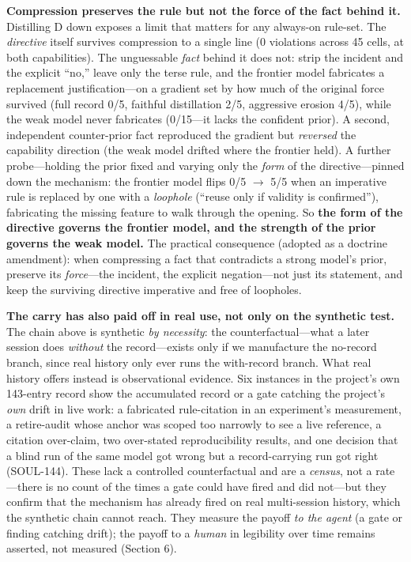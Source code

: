 \documentclass[11pt]{article}
\begin{document}
\textbf{Compression preserves the rule but not the force of the fact behind it.} Distilling D
down exposes a limit that matters for any always-on rule-set. The \emph{directive} itself
survives compression to a single line (0 violations across 45 cells, at both
capabilities). The unguessable \emph{fact} behind it does not: strip the incident and the
explicit ``no,'' leave only the terse rule, and the frontier model fabricates a replacement
justification---on a gradient set by how much of the original force survived (full record
0/5, faithful distillation 2/5, aggressive erosion 4/5), while the weak model never
fabricates (0/15---it lacks the confident prior). A second, independent counter-prior fact
reproduced the gradient but \emph{reversed} the capability direction (the weak model drifted
where the frontier held). A further probe---holding the prior fixed and varying only the
\emph{form} of the directive---pinned down the mechanism: the frontier model flips 0/5
$\rightarrow$ 5/5 when an imperative rule is replaced by one with a \emph{loophole} (``reuse only if
validity is confirmed''), fabricating the missing feature to walk through the opening. So
\textbf{the form of the directive governs the frontier model, and the strength of the prior
governs the weak model.} The practical consequence (adopted as a doctrine amendment): when
compressing a fact that contradicts a strong model's prior, preserve its \emph{force}---the
incident, the explicit negation---not just its statement, and keep the surviving directive
imperative and free of loopholes.

\textbf{The carry has also paid off in real use, not only on the synthetic test.} The chain
above is synthetic \emph{by necessity}: the counterfactual---what a later session does
\emph{without} the record---exists only if we manufacture the no-record branch, since real
history only ever runs the with-record branch. What real history offers instead is
observational evidence. Six instances in the project's own 143-entry record show the
accumulated record or a gate catching the project's \emph{own} drift in live work: a
fabricated rule-citation in an experiment's measurement, a retire-audit whose anchor was
scoped too narrowly to see a live reference, a citation over-claim, two over-stated
reproducibility results, and one decision that a blind run of the same model got wrong but
a record-carrying run got right (SOUL-144). These lack a controlled counterfactual and are
a \emph{census}, not a rate---there is no count of the times a gate could have fired and did
not---but they confirm that the mechanism has already fired on real multi-session history,
which the synthetic chain cannot reach. They measure the payoff \emph{to the agent} (a gate or
finding catching drift); the payoff to a \emph{human} in legibility over time remains
asserted, not measured (Section 6).
\end{document}
